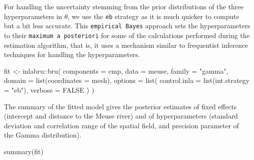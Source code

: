 \documentclass[
  a4paper,
]{article}
\newenvironment{Shaded}{\begin{snugshade}}{\end{snugshade}}
\newcommand{\AttributeTok}[1]{\textcolor[rgb]{0.40,0.45,0.13}{#1}}
\newcommand{\ConstantTok}[1]{\textcolor[rgb]{0.56,0.35,0.01}{#1}}
\newcommand{\FunctionTok}[1]{\textcolor[rgb]{0.28,0.35,0.67}{#1}}
\newcommand{\NormalTok}[1]{\textcolor[rgb]{0.00,0.23,0.31}{#1}}
\newcommand{\OtherTok}[1]{\textcolor[rgb]{0.00,0.23,0.31}{#1}}
\newcommand{\SpecialCharTok}[1]{\textcolor[rgb]{0.37,0.37,0.37}{#1}}
\newcommand{\StringTok}[1]{\textcolor[rgb]{0.13,0.47,0.30}{#1}}
\begin{document}
For handling the uncertainty stemming from the prior distributions of
the three hyperparameters in \(\theta\), we use the \texttt{eb} strategy
as it is much quicker to compute but a bit less accurate. This
\texttt{empirical\ Bayes} approach sets the hyperparameters to their
\texttt{maximum\ a\ posteriori} for some of the calculations performed
during the estimation algorithm, that is, it uses a mechanism similar to
frequentist inference techniques for handling the hyperparameters.

\begin{Shaded}
\begin{Highlighting}[]
\NormalTok{fit }\OtherTok{\textless{}{-}}\NormalTok{ inlabru}\SpecialCharTok{::}\FunctionTok{bru}\NormalTok{(}
  \AttributeTok{components =}\NormalTok{ cmp,}
  \AttributeTok{data =}\NormalTok{ meuse,}
  \AttributeTok{family =} \StringTok{"gamma"}\NormalTok{,}
  \AttributeTok{domain =} \FunctionTok{list}\NormalTok{(}\AttributeTok{coordinates =}\NormalTok{ mesh),}
  \AttributeTok{options =} \FunctionTok{list}\NormalTok{(}
    \AttributeTok{control.inla =} \FunctionTok{list}\NormalTok{(}\AttributeTok{int.strategy =} \StringTok{"eb"}\NormalTok{),}
    \AttributeTok{verbose =} \ConstantTok{FALSE}
\NormalTok{  )}
\NormalTok{)}
\end{Highlighting}
\end{Shaded}

The summary of the fitted model gives the posterior estimates of fixed
effects (intercept and distance to the Meuse river) and of
hyperparameters (standard deviation and correlation range of the spatial
field, and precision parameter of the Gamma distribution).

\begin{Shaded}
\begin{Highlighting}[]
\FunctionTok{summary}\NormalTok{(fit)}
\end{Highlighting}
\end{Shaded}
\end{document}
